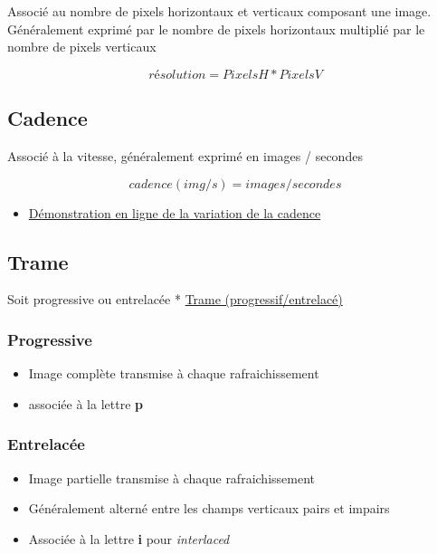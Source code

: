 \documentclass[
  french,
]{book}
\providecommand{\tightlist}{%
  \setlength{\itemsep}{0pt}\setlength{\parskip}{0pt}}
\begin{document}
Associé au nombre de pixels horizontaux et verticaux composant une image.
Généralement exprimé par le nombre de pixels horizontaux multiplié par le nombre de pixels verticaux

\[
résolution  = PixelsH * PixelsV 
\]

\hypertarget{cadence}{%
\subsection{Cadence}\label{cadence}}

Associé à la vitesse, généralement exprimé en images / secondes

\[
cadence (img/s) = images / secondes
\]

\begin{itemize}
\tightlist
\item
  \href{https://frames-per-second.appspot.com}{Démonstration en ligne de la variation de la cadence}
\end{itemize}

\hypertarget{trame}{%
\subsection{Trame}\label{trame}}

Soit progressive ou entrelacée
* \href{https://web.archive.org/web/20140222010640/http://neuron2.net/LVG/interlacing.html}{Trame (progressif/entrelacé)}

\hypertarget{progressive}{%
\subsubsection{Progressive}\label{progressive}}

\begin{itemize}
\tightlist
\item
  Image complète transmise à chaque rafraichissement
\item
  associée à la lettre \textbf{p}
\end{itemize}

\hypertarget{entrelacuxe9e}{%
\subsubsection{Entrelacée}\label{entrelacuxe9e}}

\begin{itemize}
\tightlist
\item
  Image partielle transmise à chaque rafraichissement
\item
  Généralement alterné entre les champs verticaux pairs et impairs
\item
  Associée à la lettre \textbf{i} pour \emph{interlaced}
\end{itemize}
\end{document}
